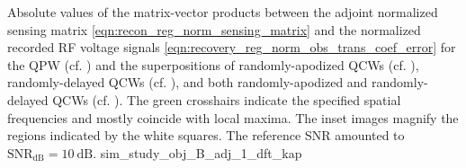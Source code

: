 %
{%
 Absolute values of
 the matrix-vector products between
 the adjoint normalized sensing matrix
 \eqref{eqn:recon_reg_norm_sensing_matrix} and
 the normalized recorded \ac{RF} voltage signals
 \eqref{eqn:recovery_reg_norm_obs_trans_coef_error} for
 the \acl{QPW}
 (cf. ) and
 the superpositions of
 randomly-apodized \acfp{QCW}
 (cf. ),
 randomly-delayed \acp{QCW}
 (cf. ), and both
 randomly-apodized and
 randomly-delayed \acp{QCW}
 (cf. ).
 The green crosshairs indicate
 the specified spatial frequencies and mostly coincide with
 local maxima.
 The inset images magnify
 the regions indicated by
 the white squares.
 The reference \ac{SNR} amounted to
 $\text{SNR}_{\text{dB}} = \SI{10}{\deci\bel}$.
}%
{sim_study_obj_B_adj_1_dft_kap}


